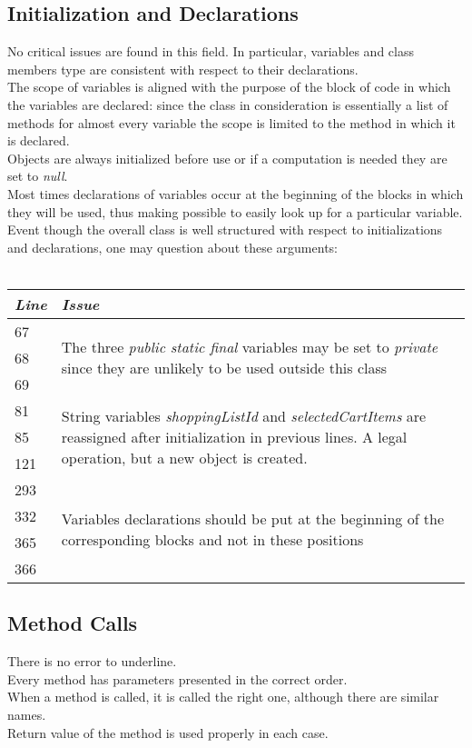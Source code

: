 \documentclass[11pt,a4paper]{report}
\begin{document}
\subsection{Initialization and Declarations}
No critical issues are found in this field. In particular, variables and class members type are consistent with respect to their declarations.\\The scope of variables is aligned with the purpose of the block of code in which the variables are declared: since the class in consideration is essentially a list of methods for almost every variable the scope is limited to the method in which it is declared.\\Objects are always initialized before use or if a computation is needed they are set to \textit{null}.\\Most times declarations of variables occur at the beginning of the blocks in which they will be used, thus making possible to easily look up for a particular variable.\\
Event though the overall class is well structured with respect to initializations and declarations, one may question about these arguments:
\\\\
\begin{tabularx}{\textwidth}{|l|X|}
	\hline
	\textit{Line} & \textit{Issue}\\
	\hline
	\hline
	67 & \multirow{3}{\linewidth}{The three \textit{public static final} variables may be set to \textit{private} since they are unlikely to be used outside this class}\\
	68 & \\
	69 & \\
	\hline
	81 & \multirow{3}{\linewidth}{String variables \textit{shoppingListId} and \textit{selectedCartItems} are reassigned after initialization in previous lines. A legal operation, but a new object is created.}\\
	85 & \\
	121 & \\
	\hline
	293 & \multirow{4}{\linewidth}{Variables declarations should be put at the beginning of the corresponding blocks and not in these positions}\\
	332 & \\
	365 & \\
	366 & \\
	\hline
\end{tabularx}
\subsection{Method Calls}
There is no error to underline.\\Every method has parameters presented in the correct order.\\When a method is called, it is called the right one, although there are similar names.\\Return value of the method is used properly in each case. 
\end{document}
